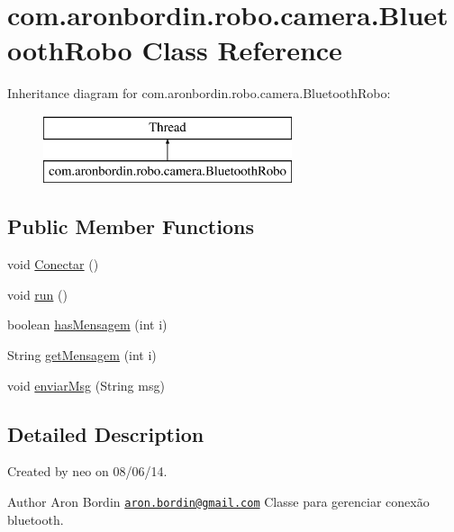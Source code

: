 \hypertarget{classcom_1_1aronbordin_1_1robo_1_1camera_1_1BluetoothRobo}{\section{com.\+aronbordin.\+robo.\+camera.\+Bluetooth\+Robo Class Reference}
\label{classcom_1_1aronbordin_1_1robo_1_1camera_1_1BluetoothRobo}
}
Inheritance diagram for com.\+aronbordin.\+robo.\+camera.\+Bluetooth\+Robo\+:\begin{figure}[H]
\begin{center}
\leavevmode
\includegraphics[height=2.000000cm]{da/df5/classcom_1_1aronbordin_1_1robo_1_1camera_1_1BluetoothRobo}
\end{center}
\end{figure}
\subsection*{Public Member Functions}
\begin{DoxyCompactItemize}
\item 
void \hyperlink{classcom_1_1aronbordin_1_1robo_1_1camera_1_1BluetoothRobo_a2df2abd3a673b28ce8c15485bbfa7445}{Conectar} ()
\item 
void \hyperlink{classcom_1_1aronbordin_1_1robo_1_1camera_1_1BluetoothRobo_a91456e33e64f7b6014eec4aab7e2aa41}{run} ()
\item 
boolean \hyperlink{classcom_1_1aronbordin_1_1robo_1_1camera_1_1BluetoothRobo_a6f90297b6ea2088d8386ef9903e8f879}{has\+Mensagem} (int i)
\item 
String \hyperlink{classcom_1_1aronbordin_1_1robo_1_1camera_1_1BluetoothRobo_adec3780ecaa5fdda458c88fb7c0614dd}{get\+Mensagem} (int i)
\item 
void \hyperlink{classcom_1_1aronbordin_1_1robo_1_1camera_1_1BluetoothRobo_acc329c69c4399635133fc72f85f696be}{enviar\+Msg} (String msg)
\end{DoxyCompactItemize}


\subsection{Detailed Description}
Created by neo on 08/06/14. \begin{DoxyAuthor}{Author}
Aron Bordin \href{mailto:aron.bordin@gmail.com}{\tt aron.\+bordin@gmail.\+com} Classe para gerenciar conexão bluetooth. 
\end{DoxyAuthor}


